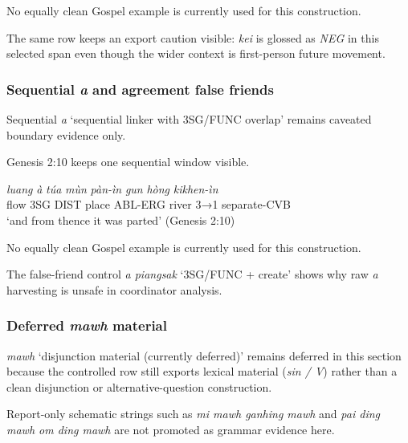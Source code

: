 \documentclass[
  11pt,
  a4paper,
]{article}
\newcommand{\tdim}[1]{\textit{#1}}
\newcommand{\tdimword}[1]{\textit{#1}}
\renewcommand{\textsc}[1]{{\footnotesize\MakeUppercase{#1}}}
\newcommand{\glossquote}[1]{`#1'}
\begin{document}
No equally clean Gospel example is currently used for this construction.

The same row keeps an export caution visible: \tdim{kei} is glossed as
\tdim{NEG} in this selected span even though the wider context is
first-person future movement.

\subsubsection{\texorpdfstring{Sequential \tdim{a} and agreement false
friends}{Sequential  and agreement false friends}}\label{sequential-and-agreement-false-friends}

Sequential \tdim{a} \glossquote{sequential linker with 3SG/FUNC overlap}
remains caveated boundary evidence only.

Genesis 2:10 keeps one sequential window visible.

\begin{exe}
\ex \label{ex:coord-a-sequential-boundary}
\gll \tdimword{luang} \tdimword{à} \tdimword{túa} \tdimword{mùn} \tdimword{pàn-ìn} \tdimword{gun} \tdimword{hòng} \tdimword{kikhen-ìn} \\
     flow \textsc{3sg} \textsc{dist} place \textsc{abl}-\textsc{erg} river \textsc{3→1} separate-\textsc{cvb} \\
\glt \glossquote{and from thence it was parted} (Genesis 2:10)
\end{exe}

No equally clean Gospel example is currently used for this construction.

The false-friend control \tdim{a piangsak}
\glossquote{3SG/FUNC + create} shows why raw \tdim{a} harvesting is
unsafe in coordinator analysis.

\subsubsection{\texorpdfstring{Deferred \tdim{mawh}
material}{Deferred  material}}\label{deferred-material-12}

\tdim{mawh} \glossquote{disjunction material (currently deferred)}
remains deferred in this section because the controlled row still
exports lexical material (\tdim{sin / V}) rather than a clean
disjunction or alternative-question construction.

Report-only schematic strings such as \tdim{mi mawh ganhing mawh} and
\tdim{pai ding mawh om ding mawh} are not promoted as grammar evidence
here.
\end{document}
